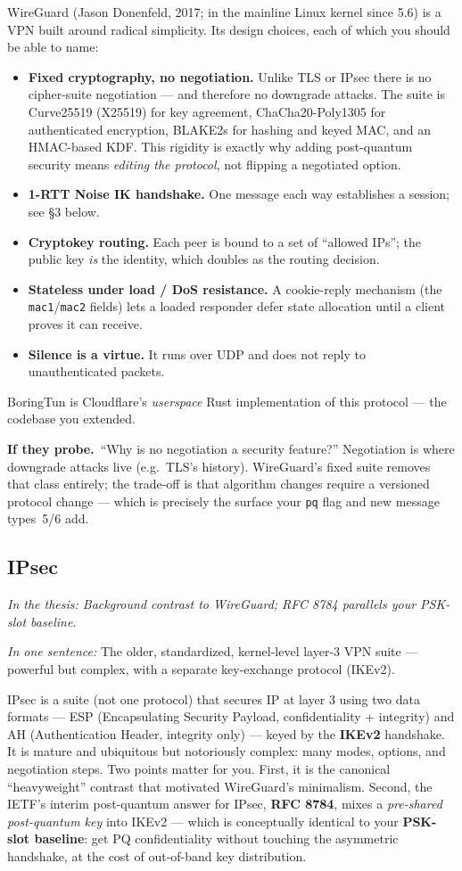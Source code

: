 \documentclass[11pt]{article}
\newcommand{\seethesis}[1]{%
  {\small\color{softgray}\textit{In the thesis: #1}}\par\vspace{3pt}}
\newcommand{\keyq}[1]{%
  \par\vspace{0.4em}%
  \noindent\colorbox{boxbg}{%
    \parbox{\dimexpr\textwidth-2\fboxsep}{%
      \small\textbf{\color{deepcyan}If they probe.}\ #1}}%
  \par\vspace{0.5em}}
\newcommand{\nutshell}[1]{\noindent\textit{In one sentence:} #1\par\vspace{4pt}}
\begin{document}
WireGuard (Jason Donenfeld, 2017; in the mainline Linux kernel since 5.6) is a
VPN built around radical simplicity. Its design choices, each of which you should
be able to name:
\begin{itemize}
  \item \textbf{Fixed cryptography, no negotiation.} Unlike TLS or IPsec there
  is no cipher-suite negotiation --- and therefore no downgrade attacks. The
  suite is Curve25519 (X25519) for key agreement, ChaCha20-Poly1305 for
  authenticated encryption, BLAKE2s for hashing and keyed MAC, and an
  HMAC-based KDF. This rigidity is exactly why adding post-quantum security
  means \emph{editing the protocol}, not flipping a negotiated option.
  \item \textbf{1-RTT Noise IK handshake.} One message each way establishes a
  session; see \S3 below.
  \item \textbf{Cryptokey routing.} Each peer is bound to a set of
  ``allowed IPs''; the public key \emph{is} the identity, which doubles as the
  routing decision.
  \item \textbf{Stateless under load / DoS resistance.} A cookie-reply
  mechanism (the \texttt{mac1}/\texttt{mac2} fields) lets a loaded responder
  defer state allocation until a client proves it can receive.
  \item \textbf{Silence is a virtue.} It runs over UDP and does not reply to
  unauthenticated packets.
\end{itemize}
BoringTun is Cloudflare's \emph{userspace} Rust implementation of this protocol
--- the codebase you extended.

\keyq{``Why is no negotiation a security feature?'' Negotiation is where
downgrade attacks live (e.g.\ TLS's history). WireGuard's fixed suite removes
that class entirely; the trade-off is that algorithm changes require a versioned
protocol change --- which is precisely the surface your \texttt{pq} flag and new
message types~5/6 add.}

\subsection{IPsec}
\seethesis{Background contrast to WireGuard; RFC 8784 parallels your PSK-slot baseline.}
\nutshell{The older, standardized, kernel-level layer-3 VPN suite --- powerful
but complex, with a separate key-exchange protocol (IKEv2).}

IPsec is a suite (not one protocol) that secures IP at layer 3 using two data
formats --- ESP (Encapsulating Security Payload, confidentiality + integrity)
and AH (Authentication Header, integrity only) --- keyed by the \textbf{IKEv2}
handshake. It is mature and ubiquitous but notoriously complex: many modes,
options, and negotiation steps. Two points matter for you. First, it is the
canonical ``heavyweight'' contrast that motivated WireGuard's minimalism.
Second, the IETF's interim post-quantum answer for IPsec, \textbf{RFC 8784},
mixes a \emph{pre-shared post-quantum key} into IKEv2 --- which is conceptually
identical to your \textbf{PSK-slot baseline}: get PQ confidentiality without
touching the asymmetric handshake, at the cost of out-of-band key distribution.
\end{document}
